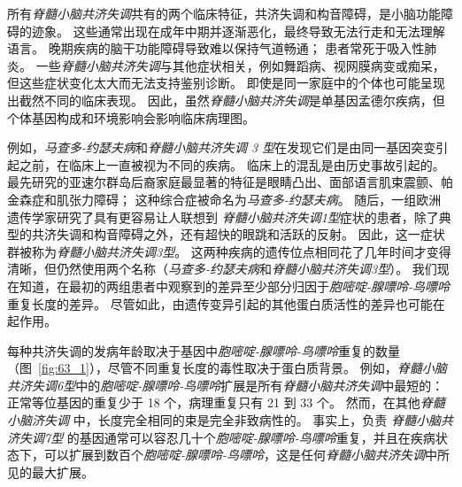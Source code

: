 所有\textit{脊髓小脑共济失调}共有的两个临床特征，共济失调和构音障碍，是小脑功能障碍的迹象。
这些通常出现在成年中期并逐渐恶化，最终导致无法行走和无法理解语言。
晚期疾病的脑干功能障碍导致难以保持气道畅通；
患者常死于吸入性肺炎。
一些\textit{脊髓小脑共济失调}与其他症状相关，例如舞蹈病、视网膜病变或痴呆，但这些症状变化太大而无法支持鉴别诊断。
即使是同一家庭中的个体也可能呈现出截然不同的临床表现。
因此，虽然\textit{脊髓小脑共济失调}是单基因孟德尔疾病，但个体基因构成和环境影响会影响临床病理图。


例如，\textit{马查多-约瑟夫病}和\textit{脊髓小脑共济失调 3 型}在发现它们是由同一基因突变引起之前，在临床上一直被视为不同的疾病。
临床上的混乱是由历史事故引起的。
最先研究的亚速尔群岛后裔家庭最显著的特征是眼睛凸出、面部语言肌束震颤、帕金森症和肌张力障碍；
这种综合症被命名为\textit{马查多-约瑟夫病}。
随后，一组欧洲遗传学家研究了具有更容易让人联想到 \textit{脊髓小脑共济失调1型}症状的患者，除了典型的共济失调和构音障碍之外，还有超快的眼跳和活跃的反射。
因此，这一症状群被称为\textit{脊髓小脑共济失调3型}。
这两种疾病的遗传位点相同花了几年时间才变得清晰，但仍然使用两个名称（\textit{马查多-约瑟夫病}和\textit{脊髓小脑共济失调3型}）。
我们现在知道，在最初的两组患者中观察到的差异至少部分归因于\textit{胞嘧啶-腺嘌呤-鸟嘌呤}重复长度的差异。
尽管如此，由遗传变异引起的其他蛋白质活性的差异也可能在起作用。


每种共济失调的发病年龄取决于基因中\textit{胞嘧啶-腺嘌呤-鸟嘌呤}重复的数量（图~\ref{fig:63_1}），尽管不同重复长度的毒性取决于蛋白质背景。
例如，\textit{脊髓小脑共济失调6型}中的\textit{胞嘧啶-腺嘌呤-鸟嘌呤}扩展是所有\textit{脊髓小脑共济失调}中最短的：正常等位基因的重复少于 18 个，病理重复只有 21 到 33 个。
然而，在其他\textit{脊髓小脑济失调} 中，长度完全相同的束是完全非致病性的。
事实上，负责 \textit{脊髓小脑共济失调7型} 的基因通常可以容忍几十个\textit{胞嘧啶-腺嘌呤-鸟嘌呤}重复，并且在疾病状态下，可以扩展到数百个\textit{胞嘧啶-腺嘌呤-鸟嘌呤}，这是任何\textit{脊髓小脑共济失调}中所见的最大扩展。



